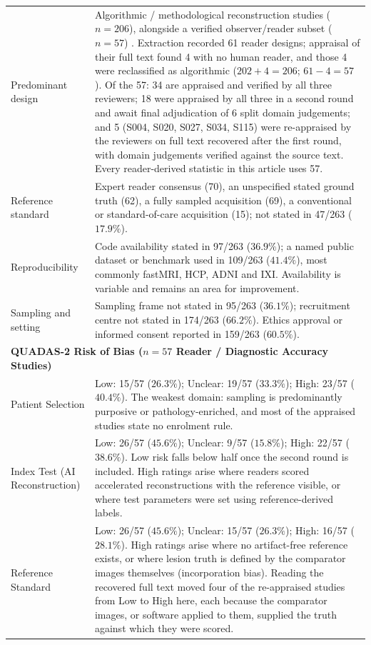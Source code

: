 \documentclass[review,authoryear]{elsarticle}
\begin{document}
{\begin{longtable}{p{} p{}}
Predominant design & Algorithmic / methodological reconstruction studies ($n=206$), alongside a verified observer/reader subset ($n=57$) \citep{radmanesh2022exploring,lang2024ultrafast}. Extraction recorded 61 reader designs; appraisal of their full text found 4 with no human reader, and those 4 were reclassified as algorithmic ($202+4=206$; $61-4=57$). Of the 57: 34 are appraised and verified by all three reviewers; 18 were appraised by all three in a second round and await final adjudication of 6 split domain judgements; and 5 (S004, S020, S027, S034, S115) were re-appraised by the reviewers on full text recovered after the first round, with domain judgements verified against the source text. Every reader-derived statistic in this article uses 57. \\
Reference standard & Expert reader consensus (70), an unspecified stated ground truth (62), a fully sampled acquisition (69), a conventional or standard-of-care acquisition (15); not stated in 47/263 ($17.9\%$). \\
Reproducibility & Code availability stated in 97/263 ($36.9\%$); a named public dataset or benchmark used in 109/263 ($41.4\%$), most commonly fastMRI, HCP, ADNI and IXI. Availability is variable and remains an area for improvement. \\
Sampling and setting & Sampling frame not stated in 95/263 ($36.1\%$); recruitment centre not stated in 174/263 ($66.2\%$). Ethics approval or informed consent reported in 159/263 ($60.5\%$). \\
\hline
\multicolumn{2}{l}{\textbf{QUADAS-2 Risk of Bias ($n=57$ Reader / Diagnostic Accuracy Studies)}} \\
\hline
Patient Selection & Low: 15/57 ($26.3\%$); Unclear: 19/57 ($33.3\%$); High: 23/57 ($40.4\%$). The weakest domain: sampling is predominantly purposive or pathology-enriched, and most of the appraised studies state no enrolment rule. \\
Index Test (AI Reconstruction) & Low: 26/57 ($45.6\%$); Unclear: 9/57 ($15.8\%$); High: 22/57 ($38.6\%$). Low risk falls below half once the second round is included. High ratings arise where readers scored accelerated reconstructions with the reference visible, or where test parameters were set using reference-derived labels. \\
Reference Standard & Low: 26/57 ($45.6\%$); Unclear: 15/57 ($26.3\%$); High: 16/57 ($28.1\%$). High ratings arise where no artifact-free reference exists, or where lesion truth is defined by the comparator images themselves (incorporation bias). Reading the recovered full text moved four of the re-appraised studies from Low to High here, each because the comparator images, or software applied to them, supplied the truth against which they were scored. \\

\end{longtable}}
\end{document}
